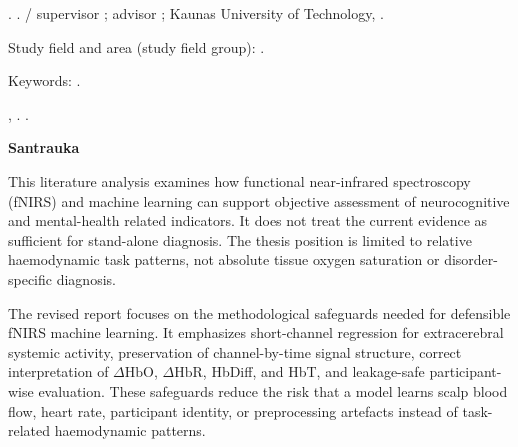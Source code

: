 \begin{titlepage}

\projectAuthorNameLT. \projectTitleLT. \projectTypeLT / supervisor \projectSupervisorNameFirstLT{}; advisor \projectSupervisorNameSecondLT{}; Kaunas University of Technology, \projectFacultyLT.

Study field and area (study field group): \projectStudyFieldAndAreaLT.

Keywords: \projectKeywordsLT.

\projectCityLT, \projectYearLT. \pageref{LastPage}.


\begin{center}
  \textbf{Santrauka}
\end{center}

This literature analysis examines how functional near-infrared spectroscopy (fNIRS) and machine learning can support objective assessment of neurocognitive and mental-health related indicators. It does not treat the current evidence as sufficient for stand-alone diagnosis. The thesis position is limited to relative haemodynamic task patterns, not absolute tissue oxygen saturation or disorder-specific diagnosis.

The revised report focuses on the methodological safeguards needed for defensible fNIRS machine learning. It emphasizes short-channel regression for extracerebral systemic activity, preservation of channel-by-time signal structure, correct interpretation of \(\Delta\mathrm{HbO}\), \(\Delta\mathrm{HbR}\), HbDiff, and HbT, and leakage-safe participant-wise evaluation. These safeguards reduce the risk that a model learns scalp blood flow, heart rate, participant identity, or preprocessing artefacts instead of task-related haemodynamic patterns.




\end{titlepage}
